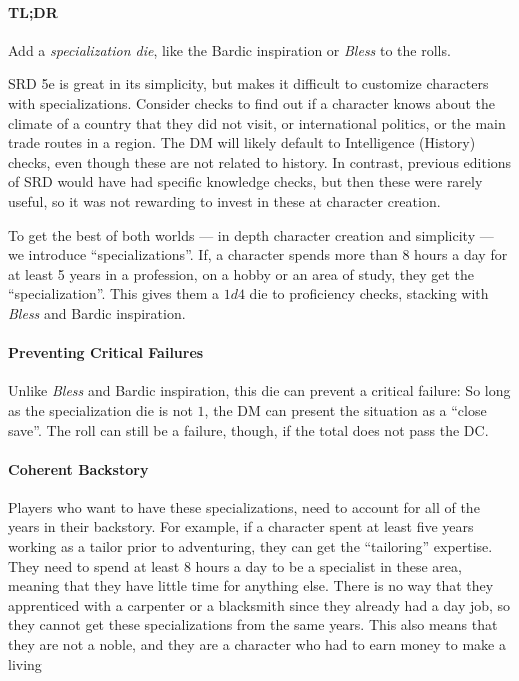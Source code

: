 \documentclass[twocolumn]{dndbook}
\begin{document}
\paragraph*{TL;DR} Add a \emph{specialization die}, like the Bardic inspiration or \emph{Bless} to the rolls.


SRD 5e is great in its simplicity, but makes it difficult to customize characters with specializations.
Consider checks to find out if a character knows about the climate of a country that they did not visit,
or international politics, or the main trade routes in a region.
The DM will likely default to Intelligence (History) checks, even though these are not related to history.
In contrast, previous editions of SRD would have had specific knowledge checks, but then these were rarely useful,
so it was not rewarding to invest in these at character creation.\par

To get the best of both worlds --- in depth character creation and simplicity --- we introduce ``specializations''.
If, a character spends more than 8 hours a day for at least 5 years in a profession, on a hobby or an area of study,
they get the ``specialization''.
This gives them a $1d4$ die to proficiency checks, stacking with \emph{Bless} and Bardic inspiration.\par

\paragraph*{Preventing Critical Failures}
Unlike \emph{Bless} and Bardic inspiration, this die can prevent a critical failure:
So long as the specialization die is not $1$, the DM can present the situation as a ``close save''.
The roll can still be a failure, though, if the total does not pass the DC.\par


\paragraph*{Coherent Backstory} Players who want to have these specializations,
need to account for all of the years in their backstory.
For example, if a character spent at least five years working as a tailor prior to adventuring,
they can get the ``tailoring'' expertise.
They need to spend at least 8 hours a day to be a specialist in these area, meaning that they have little time for anything else.
There is no way that they apprenticed with a carpenter or a blacksmith since they already
had a day job, so they cannot get these specializations from the same years.
This also means that they are not a noble, and they are a character who had to earn money to make a living\par
\end{document}
